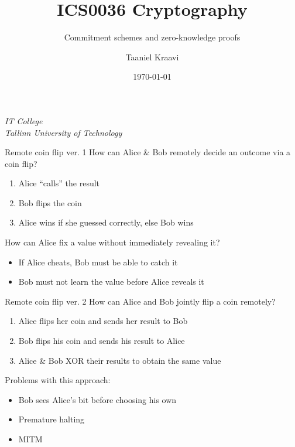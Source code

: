 \usepackage{tikz}
\usetikzlibrary{positioning,calc,external}
\graphicspath{ {../../images/} }

\title{ICS0036 Cryptography}
\subtitle{Commitment schemes and zero-knowledge proofs}
\date{\today}
\author{Taaniel Kraavi}
\institute%
{%
  \textit{IT College}\\
  \textit{Tallinn University of Technology}
}


\begin{frame}
  \titlepage
\end{frame}

\begin{frame}{Remote coin flip ver. 1}
  How can Alice \& Bob remotely decide an outcome via a coin flip?
  \begin{enumerate}[<+(1)->]
    \item Alice \enquote{calls} the result
    \item Bob flips the coin
    \item Alice wins if she guessed correctly, else Bob wins
  \end{enumerate}

  \vspace*{1em}

  \pause
  How can Alice fix a value without immediately revealing it? 
  \begin{itemize}[<+(1)->]
    \item If Alice cheats, Bob must be able to catch it
    \item Bob must not learn the value before Alice reveals it
  \end{itemize}
\end{frame}

\begin{frame}{Remote coin flip ver. 2}
  How can Alice and Bob jointly flip a coin remotely?
  \begin{enumerate}[<+(1)->]
    \item Alice flips her coin and sends her result to Bob
    \item Bob flips his coin and sends his result to Alice
    \item Alice \& Bob XOR their results to obtain the same value
  \end{enumerate}

  \vspace*{1em}

  \pause
  Problems with this approach:
  \begin{itemize}[<+(1)->]
    \item Bob sees Alice's bit before choosing his own
    \item Premature halting
    \item MITM
  \end{itemize}
\end{frame}

